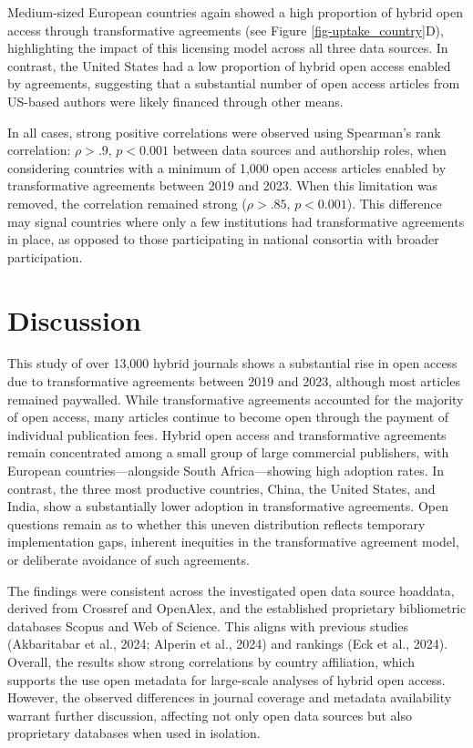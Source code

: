 \documentclass[a4paper,man,floatsintext,longtable,noextraspace,10pt]{apa6}
\begin{document}
Medium-sized European countries again showed a high proportion of hybrid
open access through transformative agreements (see Figure
\ref{fig-uptake_country}D), highlighting the impact of this licensing
model across all three data sources. In contrast, the United States had
a low proportion of hybrid open access enabled by agreements, suggesting
that a substantial number of open access articles from US-based authors
were likely financed through other means.

In all cases, strong positive correlations were observed using
Spearman's rank correlation: \(\rho > .9\), \(p < 0.001\) between data
sources and authorship roles, when considering countries with a minimum
of 1,000 open access articles enabled by transformative agreements
between 2019 and 2023. When this limitation was removed, the correlation
remained strong (\(\rho > .85\), \(p < 0.001\)). This difference may
signal countries where only a few institutions had transformative
agreements in place, as opposed to those participating in national
consortia with broader participation.

\section{Discussion}\label{discussion}

This study of over 13,000 hybrid journals shows a substantial rise in
open access due to transformative agreements between 2019 and 2023,
although most articles remained paywalled. While transformative
agreements accounted for the majority of open access, many articles
continue to become open through the payment of individual publication
fees. Hybrid open access and transformative agreements remain
concentrated among a small group of large commercial publishers, with
European countries---alongside South Africa---showing high adoption
rates. In contrast, the three most productive countries, China, the
United States, and India, show a substantially lower adoption in
transformative agreements. Open questions remain as to whether this
uneven distribution reflects temporary implementation gaps, inherent
inequities in the transformative agreement model, or deliberate
avoidance of such agreements.

The findings were consistent across the investigated open data source
hoaddata, derived from Crossref and OpenAlex, and the established
proprietary bibliometric databases Scopus and Web of Science. This
aligns with previous studies (Akbaritabar et al., 2024; Alperin et al.,
2024) and rankings (Eck et al., 2024). Overall, the results show strong
correlations by country affiliation, which supports the use open
metadata for large-scale analyses of hybrid open access. However, the
observed differences in journal coverage and metadata availability
warrant further discussion, affecting not only open data sources but
also proprietary databases when used in isolation.
\end{document}
